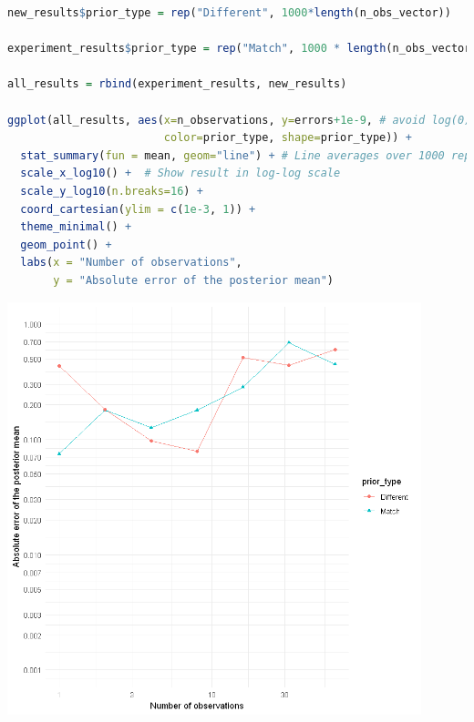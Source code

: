 \documentclass{article}
\begin{document}
\begin{enumerate}
\begin{lstlisting}[language=R]
new_results$prior_type = rep("Different", 1000*length(n_obs_vector))

experiment_results$prior_type = rep("Match", 1000 * length(n_obs_vector))

all_results = rbind(experiment_results, new_results)

ggplot(all_results, aes(x=n_observations, y=errors+1e-9, # avoid log(0) 
                        color=prior_type, shape=prior_type)) + 
  stat_summary(fun = mean, geom="line") + # Line averages over 1000 replicates
  scale_x_log10() +  # Show result in log-log scale
  scale_y_log10(n.breaks=16) +
  coord_cartesian(ylim = c(1e-3, 1)) +
  theme_minimal() +
  geom_point() +
  labs(x = "Number of observations",
       y = "Absolute error of the posterior mean")
\end{lstlisting}

\includegraphics[width=0.9\textwidth]{two_errors.png}





\end{enumerate}










 
\end{document}
